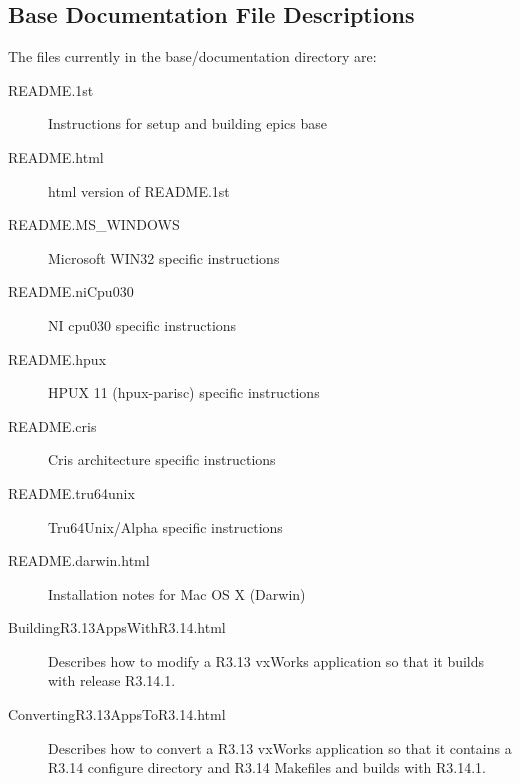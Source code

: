 \subsection{Base Documentation File Descriptions}

The files currently in the base/documentation directory are:

\begin{description}

\item[README.1st]

Instructions for setup and building epics base

\item[README.html]

html version of README.1st

\item[README.MS\_WINDOWS]

Microsoft WIN32 specific instructions

\item[README.niCpu030]

NI cpu030 specific instructions

\item[README.hpux]

HPUX 11 (hpux-parisc) specific instructions

\item[README.cris]

Cris architecture specific instructions

\item[README.tru64unix]

Tru64Unix/Alpha specific instructions

\item[README.darwin.html]

Installation notes for Mac OS X (Darwin)

\item[BuildingR3.13AppsWithR3.14.html]

Describes how to modify a R3.13 vxWorks application so that it builds with release R3.14.1.

\item[ConvertingR3.13AppsToR3.14.html]

Describes how to convert a R3.13 vxWorks application so that it contains a R3.14 configure directory and R3.14 
Makefiles and builds with R3.14.1.


\end{description}
